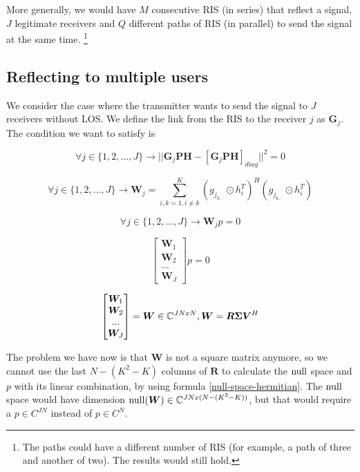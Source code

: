More generally, we would have $M$ consecutive RIS (in series) that reflect a signal, $J$ legitimate receivers and $Q$ different paths of RIS (in parallel) to send the signal at the same time. \footnote{The paths could have a different number of RIS (for example, a path of three and another of two). The results would still hold.}

\subsection{Reflecting to multiple users}

We consider the case where the transmitter wants to send the signal to $J$ receivers without LOS. We define the link from the RIS to the receiver $j$ as $\bm{G}_j$. The condition we want to satisfy is

\begin{equation}
  \forall j \in \{1, 2, \ldots , J\} \rightarrow || \bm{G}_j\bm{PH} - [\bm{G}_j\bm{PH}]_{diag} || ^2 = 0
\end{equation}

\begin{equation}
  \forall j \in \{1, 2, \ldots , J\} \rightarrow \bm{W}_j = \sum_{i,k = 1, i \ne k}^{K} (g_{j_{k,:}} \odot h_i^T)^H (g_{j_{k,:}} \odot h_i^T)
\end{equation}

\begin{equation}
  \forall j \in \{1, 2, \ldots , J\} \rightarrow \bm{W}_j p = 0
\end{equation}

\begin{equation}
  \begin{bmatrix}
    \bm{W}_1  \\
    \bm{W}_ 2 \\
    ...       \\
    \bm{W}_J
  \end{bmatrix}
  p = 0
\end{equation}

\begin{equation}
  \begin{bmatrix}
    \bm{W}_1  \\
    \bm{W}_ 2 \\
    ...       \\
    \bm{W}_J
  \end{bmatrix}
  = \bm{W} \in \mathbb{C} ^ {JNxN}, \bm{W} = \bm{R \Sigma V}^H
\end{equation}

The problem we have now is that $\bm{W}$ is not a square matrix anymore, so we cannot use the last $N - (K^2 - K)$ columns of $\bm{R}$ to calculate the $\operatorname{null}$ space and $p$ with its linear combination, by using formula \eqref{null-space-hermitian}. The $\operatorname{null}$ space would have dimension $\operatorname{null}(\bm{W}) \in \mathbb{C}^{JN x (N - (K^2 - K))}$, but that would require a $p \in C^{JN}$ instead of $p \in C^{N}$.

